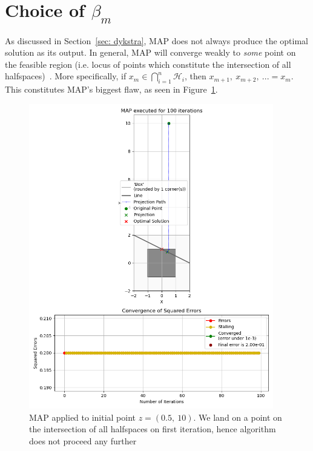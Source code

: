 \documentclass[hidelinks]{article}
\begin{document}
\section{Choice of $\beta_m$} \label{sec: new algorithm}
%
As discussed in Section~\ref{sec: dykstra}, MAP does not always produce the optimal solution as its output. In general, MAP will converge weakly to \textit{some} point on the feasible region (i.e. locus of points which constitute the intersection of all halfspaces)~\cite{BREGMAN}. More specifically, if $x_m \in \bigcap_{i=1}^n \mathcal{H}_i$, then $x_{m+1},~x_{m+2},~... = x_m$. This constitutes MAP's biggest flaw, as seen in Figure~\ref{fig:MAPterminates}.
%
\begin{figure}[h!]
    \centering
    
    \includegraphics[width=0.95\textwidth]{Latex/Current Version/Figures/in_intersection_MAP.png}
    \caption{MAP applied to initial point $z = (0.5,~10)$. We land on a point on the intersection of all halfspaces on first iteration, hence algorithm does not proceed any further}
    \label{fig:MAPterminates}

\end{figure}
\end{document}
